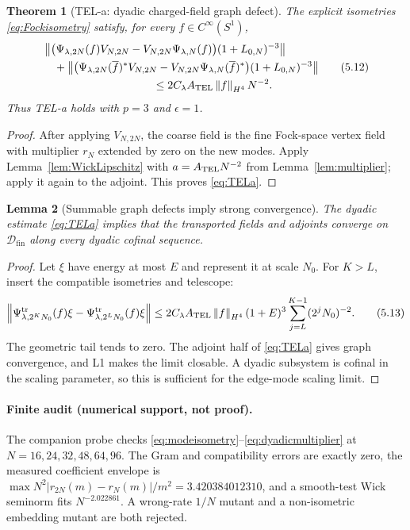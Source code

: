 \documentclass[11pt]{article}
\newtheorem{theorem}{Theorem}[section]
\newtheorem{lemma}[theorem]{Lemma}
\theoremstyle{remark}
\newcommand{\Dfin}{\mathcal D_{\mathrm{fin}}}
\newcommand{\norm}[1]{\left\lVert#1\right\rVert}
\begin{document}
\begin{theorem}[TEL-a: dyadic charged-field graph defect]
\label{thm:TELa}
The explicit isometries \eqref{eq:Fockisometry} satisfy, for every
$f\in C^\infty(S^1)$,
\[
\begin{aligned}
 &\norm{\bigl(\Psi_{\lambda,2N}(f)V_{N,2N}
       -V_{N,2N}\Psi_{\lambda,N}(f)\bigr)(1+L_{0,N})^{-3}}\\
 &\quad+
 \norm{\bigl(\Psi_{\lambda,2N}(\overline f)^*V_{N,2N}
       -V_{N,2N}\Psi_{\lambda,N}(\overline f)^*\bigr)
       (1+L_{0,N})^{-3}}\\
 &\hspace{35mm}\le
 2C_\lambda A_{\rm TEL}\norm{f}_{H^4}N^{-2}.
\end{aligned}
\tag{5.12}\label{eq:TELa}
\]
Thus TEL-a holds with $p=3$ and $\epsilon=1$.
\end{theorem}

\begin{proof}
After applying $V_{N,2N}$, the coarse field is the fine Fock-space
vertex field with multiplier $r_N$ extended by zero on the new modes.
Apply Lemma~\ref{lem:WickLipschitz} with
$a=A_{\rm TEL}N^{-2}$ from Lemma~\ref{lem:multiplier}; apply it again
to the adjoint.  This proves \eqref{eq:TELa}.
\end{proof}

\begin{lemma}[Summable graph defects imply strong convergence]
\label{lem:telescoping}
The dyadic estimate \eqref{eq:TELa} implies that the transported fields
and adjoints converge on $\Dfin$ along every dyadic cofinal sequence.
\end{lemma}

\begin{proof}
Let $\xi$ have energy at most $E$ and represent it at scale $N_0$.
For $K>L$, insert the compatible isometries and telescope:
\[
\norm{\Psi_{\lambda,2^KN_0}^{\rm tr}(f)\xi
      -\Psi_{\lambda,2^LN_0}^{\rm tr}(f)\xi}
\le
2C_\lambda A_{\rm TEL}\norm{f}_{H^4}(1+E)^3
\sum_{j=L}^{K-1}(2^jN_0)^{-2}.
\tag{5.13}\label{eq:telestimate}
\]
The geometric tail tends to zero.  The adjoint half of
\eqref{eq:TELa} gives graph convergence, and L1 makes the limit
closable.  A dyadic subsystem is cofinal in the scaling parameter, so
this is sufficient for the edge-mode scaling limit.
\end{proof}

\paragraph{Finite audit (numerical support, not proof).}
The companion probe
checks \eqref{eq:modeisometry}--\eqref{eq:dyadicmultiplier} at
$N=16,24,32,48,64,96$.  The Gram and compatibility errors are exactly
zero, the measured coefficient envelope is
$\max N^2|r_{2N}(m)-r_N(m)|/m^2=3.420384012310$, and a smooth-test Wick
seminorm fits $N^{-2.022861}$.  A wrong-rate $1/N$ mutant and a
non-isometric embedding mutant are both rejected.
\end{document}
